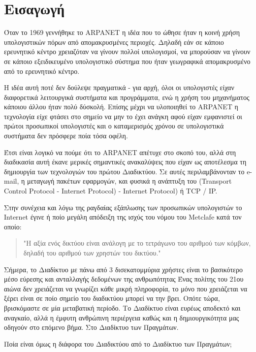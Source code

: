 \chapter{Εισαγωγή}\label{ch:intro}

Όταν το 1969 γεννήθηκε το ARPANET η ιδέα που το ώθησε  ήταν η κοινή χρήση υπολογιστικών πόρων από απομακρυσμένες περιοχές. Δηλαδή εάν σε κάποιο ερευνητικό κέντρο χρειαζόταν να γίνουν πολλοί υπολογισμοί, να μπορούσαν να γίνουν σε κάποιο εξειδικευμένο υπολογιστικό σύστημα που ήταν γεωγραφικά απομακρυσμένο από το ερευνητικό κέντρο.

H ιδέα αυτή ποτέ δεν δούλεψε πραγματικά - για αρχή, όλοι οι υπολογιστές είχαν διαφορετικά λειτουργικά συστήματα και προγράμματα, ενώ η χρήση του μηχανήματος κάποιου άλλου ήταν πολύ δύσκολή. Επίσης μέχρι να υλοποιηθεί το ARPANET η τεχνολογία είχε φτάσει στο σημείο να μην το έχει ανάγκη αφού είχαν εμφανιστεί οι πρώτοι προσωπικοί υπολογιστές και ο καταμερισμός χρόνου σε υπολογιστικά συστήματα δεν πρόσφερε ποία τόσα οφέλη.

Έτσι είναι λογικό να πούμε ότι το ARPANET απέτυχε στο σκοπό του, αλλά στη διαδικασία αυτή έκανε μερικές σημαντικές ανακαλύψεις που είχαν ως αποτέλεσμα τη δημιουργία των τεχνολογιών του πρώτου Διαδικτύου. Σε αυτές περιλαμβάνονταν το e-mail, η μεταγωγή πακέτων εφαρμογών, και φυσικά η ανάπτυξη του (Transport Control Protocol - Internet Protocol) - Internet Protocol) ή TCP / IP.

Στην συνέχεια και λόγω της ραγδαίας εξάπλωσης των προσωπικών υπολογιστών το Internet έγινε ή ποίο μεγάλη απόδειξη της ισχύς του νόμου του Metclafe κατά τον οποίο:%
\begin{quotation}
"Η αξία ενός δικτύου είναι ανάλογη με το τετράγωνο του αριθμού των κόμβων, δηλαδή του αριθμού των χρηστών του δικτύου."
\end{quotation}

Σήμερα, το Διαδίκτυο με πάνω από 3 δισεκατομμύρια χρήστες είναι το βασικότερο μέσο 
εύρεσης και ανταλλαγής δεδομένων της ανθρωπότητας Ένας πολίτης του 21ου αιώνα δεν χρειάζεται να γνωρίζει κάθε μικρή πληροφορία, το μόνο που χρειάζεται να ξέρει είναι σε ποίο σημείο του διαδικτύου μπορεί να την βρει. Οπότε τώρα, βρισκόμαστε σε μία μεταβατική περίοδο. Το Διαδίκτυο είναι ευρέως αποδεκτό και αναγκαίο, αλλά η έμφυτη ανθρώπινη περιέργεια καθώς και η δημιουργικότητα μας οδηγούν στο επόμενο βήμα. Στο Διαδίκτυο των Πραγμάτων.

Ποία είναι όμως η διάφορα του Διαδικτύου από το Διαδίκτυο των Πραγμάτων; 

